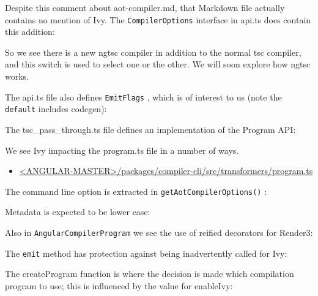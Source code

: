 

Despite this comment about aot-compiler.md, that Markdown file actually contains no
mention of Ivy. The
\texttt{CompilerOptions}
interface in api.ts does contain this addition:



So we see there is a new ngtsc compiler in addition to the normal tsc compiler, and
this switch is used to select one or the other. We will soon explore how ngtsc works.

The api.ts file also defines
\texttt{EmitFlags}
, which is of interest to us (note the
\texttt{default}
includes codegen):



The tsc\_pass\_through.ts file defines an implementation of the Program API:



We see Ivy impacting the program.ts file in a number of ways.

\begin{itemize}
  \item \href{https://github.com/angular/angular/blob/master/packages/compiler-cli/src/transformers/program.ts}
        {<ANGULAR-MASTER>/packages/compiler-cli/src/transformers/program.ts}
\end{itemize}

The command line option is extracted in
\texttt{getAotCompilerOptions()}
:



Metadata is expected to be lower case:



Also in
\texttt{AngularCompilerProgram}
we see the use of reified decorators for Render3:



The
\texttt{emit}
method has protection against being inadvertently called for Ivy:



The createProgram function is where the decision is made which compilation program
to use; this is influenced by the value for enableIvy:



